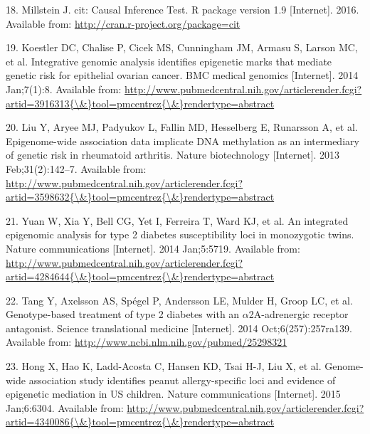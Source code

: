 \documentclass[]{article}
\begin{document}
\hypertarget{ref-Millstein2016}{}
18. Millstein J. cit: Causal Inference Test. R package version 1.9
{[}Internet{]}. 2016. Available from:
\url{http://cran.r-project.org/package=cit}

\hypertarget{ref-Koestler2014}{}
19. Koestler DC, Chalise P, Cicek MS, Cunningham JM, Armasu S, Larson
MC, et al. Integrative genomic analysis identifies epigenetic marks that
mediate genetic risk for epithelial ovarian cancer. BMC medical genomics
{[}Internet{]}. 2014 Jan;7(1):8. Available from:
\href{http://www.pubmedcentral.nih.gov/articlerender.fcgi?artid=3916313\%7B/\&\%7Dtool=pmcentrez\%7B/\&\%7Drendertype=abstract}{http://www.pubmedcentral.nih.gov/articlerender.fcgi?artid=3916313\{\textbackslash{}\&\}tool=pmcentrez\{\textbackslash{}\&\}rendertype=abstract}

\hypertarget{ref-Liu2013}{}
20. Liu Y, Aryee MJ, Padyukov L, Fallin MD, Hesselberg E, Runarsson A,
et al. Epigenome-wide association data implicate DNA methylation as an
intermediary of genetic risk in rheumatoid arthritis. Nature
biotechnology {[}Internet{]}. 2013 Feb;31(2):142--7. Available from:
\href{http://www.pubmedcentral.nih.gov/articlerender.fcgi?artid=3598632\%7B/\&\%7Dtool=pmcentrez\%7B/\&\%7Drendertype=abstract}{http://www.pubmedcentral.nih.gov/articlerender.fcgi?artid=3598632\{\textbackslash{}\&\}tool=pmcentrez\{\textbackslash{}\&\}rendertype=abstract}

\hypertarget{ref-Yuan2014}{}
21. Yuan W, Xia Y, Bell CG, Yet I, Ferreira T, Ward KJ, et al. An
integrated epigenomic analysis for type 2 diabetes susceptibility loci
in monozygotic twins. Nature communications {[}Internet{]}. 2014
Jan;5:5719. Available from:
\href{http://www.pubmedcentral.nih.gov/articlerender.fcgi?artid=4284644\%7B/\&\%7Dtool=pmcentrez\%7B/\&\%7Drendertype=abstract}{http://www.pubmedcentral.nih.gov/articlerender.fcgi?artid=4284644\{\textbackslash{}\&\}tool=pmcentrez\{\textbackslash{}\&\}rendertype=abstract}

\hypertarget{ref-Tang2014}{}
22. Tang Y, Axelsson AS, Spégel P, Andersson LE, Mulder H, Groop LC, et
al. Genotype-based treatment of type 2 diabetes with an
\(\alpha\)2A-adrenergic receptor antagonist. Science translational
medicine {[}Internet{]}. 2014 Oct;6(257):257ra139. Available from:
\url{http://www.ncbi.nlm.nih.gov/pubmed/25298321}

\hypertarget{ref-Hong2015}{}
23. Hong X, Hao K, Ladd-Acosta C, Hansen KD, Tsai H-J, Liu X, et al.
Genome-wide association study identifies peanut allergy-specific loci
and evidence of epigenetic mediation in US children. Nature
communications {[}Internet{]}. 2015 Jan;6:6304. Available from:
\href{http://www.pubmedcentral.nih.gov/articlerender.fcgi?artid=4340086\%7B/\&\%7Dtool=pmcentrez\%7B/\&\%7Drendertype=abstract}{http://www.pubmedcentral.nih.gov/articlerender.fcgi?artid=4340086\{\textbackslash{}\&\}tool=pmcentrez\{\textbackslash{}\&\}rendertype=abstract}
\end{document}
